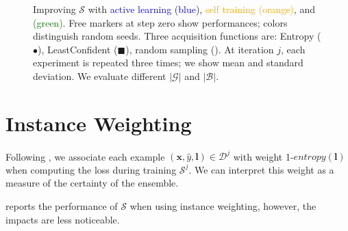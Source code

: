 \begin{figure}[t]
{}
\hspace{-.2cm}
\hspace{-.2cm}
\hspace{-.2cm}

\caption{
  Improving $\mathcal{S}$ with
  \textcolor{blue}{active learning (blue)},
  \textcolor{orange}{self training (orange)},
  and
  \textcolor{green}{\md (green)}.
  Free markers at step zero show \mdr performances;
  colors distinguish random seeds.
  Three acquisition functions are:
  Entropy ($\bullet$),
  LeastConfident (\tiny$\blacksquare$\normalsize),
  random sampling (\tiny\XSolidBold\normalsize).
  At iteration $j$, each experiment is repeated
  three times; we show
  mean and standard deviation.
  We evaluate different $|\mathcal{G}|$ and $|\mathcal{B}|$.
}
\end{figure}




\section{Instance Weighting}
Following \citet{wang-etal-2017-instance},
we associate each example
$(\textbf{x}, \hat{y}, \textbf{l}) \in \mathcal{D}^{j}$
with weight
1-$entropy(\textbf{l})$ when
computing the loss during
training $\mathcal{S}^{j}$.
We can interpret this weight as a measure
of the certainty of the \mdrs ensemble.


 reports
the performance of $\mathcal{S}$
when using instance weighting,
however, the impacts are less noticeable.





